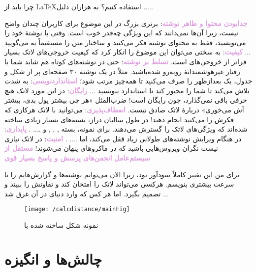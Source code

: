 چرا باید از \LaTeX استفاده کنیم؟ به هزاران دلیل .....
\begin{itemize}
\tick \textcolor{Plum}{\textbf{جدابودن محتوا و ظاهر نوشته‌}}:
برتری بزرگ \lr{\LaTeX} در این موضوع برای کاربران  چندان واضح نیست، زیرا آن‌ها نمی‌دانند که این ویژگی چه‌قدر خوب است. وقتی با 
\lr{\LaTeX}
 نوشتهٔ خود را می‌نویسید، فقط به محتوای نوشته فکر می‌کنید و ساختار متن را مستقیماً به \lr{\LaTeX} می‌گویید ... 
\tick \textcolor{Plum}{\textbf{کیفیت}}:
به سختی می‌توان این موضوع را انکار کرد که کیفیت خروجی‌های لاتک بسیار فراتر از خروجی‌های
است.
\tick \textcolor{Plum}{\textbf{تسلط بر نوشته}}:
حتی در نوشته‌های کوتاه هم شاید شما با رفتار غیرهوشمندانهٔ  روبه‌رو شده‌باشید. مثلاً در یک نوشتهٔ ۳۰ صفحه‌ای پر از شکل و جدول، یک بعدازظهر را صرف می‌کنید تا همه‌چیز مرتب شود؛
\tick \textcolor{Plum}{\textbf{استانداردنویسی}}:
\lr{\LaTeX}
به شدت تلاش می‌کند تا شما را مجبور کند تا استاندارد بنویسید ... 
\tick \textcolor{Plum}{\textbf{رایگان}}:
در این مورد لاتک هیچ حرفی باقی نمی‌گذارد، چون رایگان است! ضرب‌المثل «هر چی بیشتر پول بدی، بیشتر آش می‌خوری» دربارهٔ لاتک صادق نیست.
\tick \textcolor{Plum}{\textbf{انعطاف‌پذیری}}:
می‌توانید با لاتک هرکاری که فکرش را می‌کنید انجام دهید! در طول سالیان دراز، بسته‌های بسیار زیادی ساخته شده‌اند که ویژگی‌های لاتک را گسترش می‌دهند. برای نمونه، بسته
, , ,  و .... .
\tick \textcolor{Plum}{\textbf{پایداری‌}}:  
در هنگام ویرایش نوشته‌های طولانی زیاد قفل می‌کند، اما 
\lr{\TeX{}} .... . 
\tick \textcolor{Plum}{\textbf{امنیت‌}}:
 در لاتک نیازی نیست نگران ویروس‌هایی باشید که در ماکروهای  پنهان می‌شوند!
\tick \textcolor{Plum}{\textbf{مستقل از سیستم‌عامل}}
\tick \textcolor{Plum}{\textbf{انجمن‌های پرسش و پاسخ بسیار قوی}}
\end{itemize}

برای من این تغییر کاملاً سودآور بود، زیرا الان می‌توانم نوشته‌ها و گزارش‌هایم را با سرعت بیشتری بنویسم. هرکسی می‌تواند لاتک را امتحان کند و تفاوتش را ببیند و تصمیم بگیرد. اما هر کس که وارد دنیای
\lr{\LaTeX}
در آن غرق شد ... 

\begin{figure}
\texttt{[image: /calcdistance/mainFig]}
\caption{%
نمونه شکل ساخته شده با 
}
\label{fig:cellgeom}
\end{figure}

\section{چالش‌ها و انگیزه}


